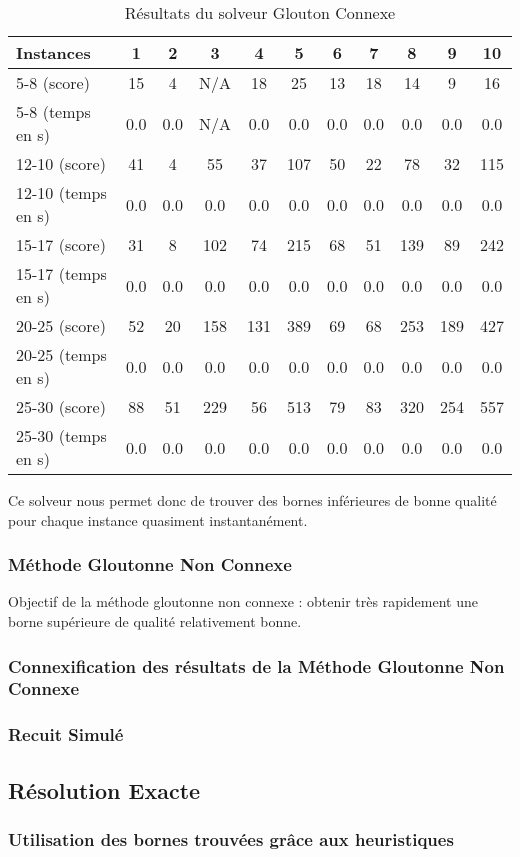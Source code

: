\documentclass[a4paper,11pt]{article}
\begin{document}
\begin{table}[h!]
\begin{center}
\begin{tabular}{|l|c|c|c|c|c|c|c|c|c|c|}
\hline
Instances & 1 & 2 & 3 & 4 & 5 & 6 & 7 & 8 & 9 & 10  \\
\hline
5-8 (score)         & 15  & 4   & N/A & 18  & 25  & 13  & 18  & 14  & 9   & 16 \\
\hline
5-8 (temps en s)    & 0.0 & 0.0 & N/A & 0.0 & 0.0 & 0.0 & 0.0 & 0.0 & 0.0 & 0.0 \\
\hline
12-10 (score)       & 41  & 4   & 55  & 37  & 107 & 50  & 22  & 78  & 32  & 115\\
\hline
12-10 (temps en s)  & 0.0 & 0.0 & 0.0 & 0.0 & 0.0 & 0.0 & 0.0 & 0.0 & 0.0 & 0.0 \\
\hline
15-17 (score)       & 31  & 8   & 102 & 74  & 215 & 68  & 51  & 139 & 89  & 242\\
\hline
15-17 (temps en s)  & 0.0 & 0.0 & 0.0 & 0.0 & 0.0 & 0.0 & 0.0 & 0.0 & 0.0 & 0.0 \\
\hline
20-25 (score)       & 52  & 20  & 158 & 131 & 389 & 69  & 68  & 253 & 189 & 427\\
\hline
20-25 (temps en s)  & 0.0 & 0.0 & 0.0 & 0.0 & 0.0 & 0.0 & 0.0 & 0.0 & 0.0 & 0.0 \\
\hline
25-30 (score)       & 88  & 51  & 229 & 56  & 513 & 79  & 83  & 320 & 254 & 557\\
\hline
25-30 (temps en s)  & 0.0 & 0.0 & 0.0 & 0.0 & 0.0 & 0.0 & 0.0 & 0.0 & 0.0 & 0.0 \\
\hline
\end{tabular}
\end{center}
\caption{Résultats du solveur Glouton Connexe}
\end{table}

Ce solveur nous permet donc de trouver des bornes inférieures de bonne qualité pour chaque instance quasiment instantanément.

\subsubsection{Méthode Gloutonne Non Connexe}

Objectif de la méthode gloutonne non connexe : obtenir très rapidement une borne supérieure de qualité relativement bonne.

\subsubsection{Connexification des résultats de la Méthode Gloutonne Non Connexe}

\subsubsection{Recuit Simulé}

\subsection{Résolution Exacte}

\subsubsection{Utilisation des bornes trouvées grâce aux heuristiques}
\end{document}
